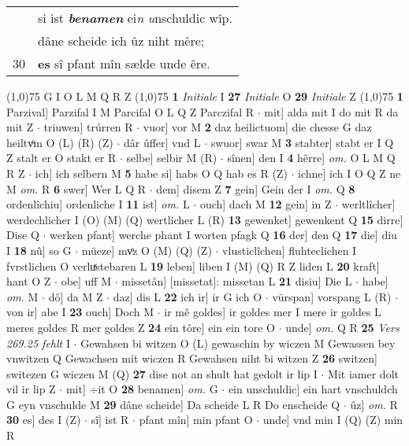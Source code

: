 \documentclass[8pt,a4paper,notitlepage]{article}
\begin{document}
\begin{table}[ht]
\begin{minipage}[t]{0.5\linewidth}
\begin{tabular}{rl}
 & si ist \textit{\textbf{benamen}} ei\textit{n} \textit{u}nschuldic wîp.\\ 
 & dâne scheide ich ûz niht mêre;\\ 
30 & \textbf{es} sî pfant mîn sælde unde êre.\\ 
\end{tabular}
\scriptsize
\line(1,0){75} \newline
G I O L M Q R Z \newline
\line(1,0){75} \newline
\textbf{1} \textit{Initiale} I  \textbf{27} \textit{Initiale} O  \textbf{29} \textit{Initiale} Z  \newline
\line(1,0){75} \newline
\textbf{1} Parzival] Parzifal I M Parcifal O L Q Z Parczifal R  $\cdot$ mit] alda mit I do mit R da mit Z  $\cdot$ triuwen] trúrren R  $\cdot$ vuor] vor M \textbf{2} daz heilictuom] die chesse G daz heiltvͦm O (L) (R) (Z)  $\cdot$ dâr ûffer] vnd L  $\cdot$ swuor] swar M \textbf{3} stabter] stabt er I Q Z stalt er O stakt er R  $\cdot$ selbe] selbir M (R)  $\cdot$ sînen] den I \textbf{4} hêrre] \textit{om.} O L M Q R Z  $\cdot$ ich] ich selbern M \textbf{5} habe si] habs O Q hab es R (Z)  $\cdot$ ichne] ich I O Q Z ne M \textit{om.} R \textbf{6} swer] Wer L Q R  $\cdot$ dem] disem Z \textbf{7} gein] Gein der I \textit{om.} Q \textbf{8} ordenlîchiu] ordenliche I \textbf{11} ist] \textit{om.} L  $\cdot$ ouch] dach M \textbf{12} gein] in Z  $\cdot$ werltlîcher] werdechlicher I (O) (M) (Q) wertlicher L (R) \textbf{13} gewenket] gewenkent Q \textbf{15} dirre] Dise Q  $\cdot$ werken pfant] werche phant I worten pfagk Q \textbf{16} der] den Q \textbf{17} die] diu I \textbf{18} nû] so G  $\cdot$ müeze] mvͦz O (M) (Q) (Z)  $\cdot$ vlusticlîchen] fluhteclichen I fvrstlichen O verluͯstebaren L \textbf{19} leben] liben I (M) (Q) R Z liden L \textbf{20} kraft] hant O Z  $\cdot$ obe] uff M  $\cdot$ missetân] [missetat]: missetan L \textbf{21} disiu] Die L  $\cdot$ habe] \textit{om.} M  $\cdot$ dô] da M Z  $\cdot$ daz] dis L \textbf{22} ich ir] ir G ich O  $\cdot$ vürspan] vorspang L (R)  $\cdot$ von ir] abe I \textbf{23} ouch] Doch M  $\cdot$ ir mê goldes] ir goldes mer I mere ir goldes L meres goldes R mer goldes Z \textbf{24} ein tôre] ein ein tore O  $\cdot$ unde] \textit{om.} Q R \textbf{25} \textit{Vers 269.25 fehlt} I   $\cdot$ Gewahsen bi witzen O (L) gewaschin by wiczen M Gewassen bey vnwitzen Q Gewachsen mit wiczen R Gewahsen niht bi witzen Z \textbf{26} switzen] switezen G wiczen M (Q) \textbf{27} dise not an shult hat gedolt ir lip I  $\cdot$ Mit iamer dolt vil ir lip Z  $\cdot$ mit] ÷it O \textbf{28} benamen] \textit{om.} G  $\cdot$ ein unschuldic] ein hart vnschuldch G eyn vnschulde M \textbf{29} dâne scheide] Da scheide L R Do enscheide Q  $\cdot$ ûz] \textit{om.} R \textbf{30} es] des I (Z)  $\cdot$ sî] ist R  $\cdot$ pfant mîn] min pfant O  $\cdot$ unde] vnd min I (Q) (Z) min R \newline

\end{minipage}
\end{table}
\end{document}
